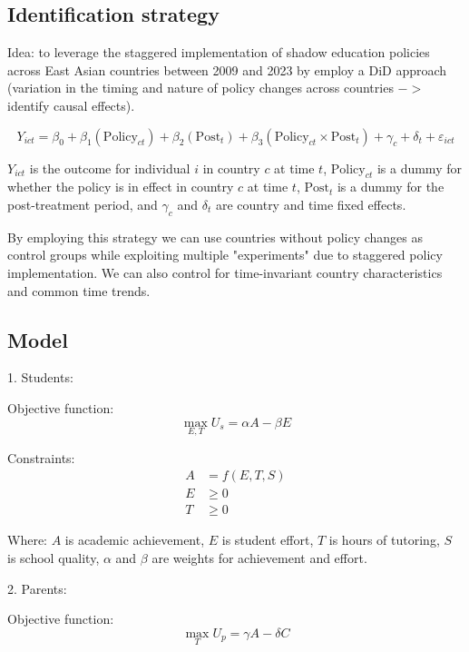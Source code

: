 \documentclass[12pt,a4paper,onecolumn]{article}
\numberwithin{equation}{section}
\begin{document}
\subsection{Identification strategy}

Idea: to leverage the staggered implementation of shadow education policies across East Asian countries between 2009 and 2023 by employ a DiD approach (variation in the timing and nature of policy changes across countries $->$ identify causal effects).

\begin{equation}
    Y_{ict} = \beta_0 + \beta_1(\text{Policy}_{ct}) + \beta_2(\text{Post}_t) + \beta_3(\text{Policy}_{ct} \times \text{Post}_t) + \gamma_c + \delta_t + \varepsilon_{ict}
\end{equation}

$Y_{ict}$ is the outcome for individual $i$ in country $c$ at time $t$, $\text{Policy}_{ct}$ is a dummy for whether the policy is in effect in country $c$ at time $t$, $\text{Post}_t$ is a dummy for the post-treatment period, and $\gamma_c$ and $\delta_t$ are country and time fixed effects.

By employing this strategy we can use countries without policy changes as control groups while exploiting multiple "experiments" due to staggered policy implementation. We can also control for time-invariant country characteristics and common time trends.

\subsection{Model}

1. Students:

Objective function:
\begin{equation}
    \max_{E,T} U_s = \alpha A - \beta E
\end{equation}

Constraints:
\[
\begin{aligned}
A &= f(E, T, S) \\
E &\geq 0 \\
T &\geq 0
\end{aligned}
\]

Where:
$A$ is academic achievement, $E$ is student effort, $T$ is hours of tutoring, $S$ is school quality, $\alpha$ and $\beta$ are weights for achievement and effort.

2. Parents:

Objective function:
\begin{equation}
    \max_{T} U_p = \gamma A - \delta C
\end{equation}
\end{document}
